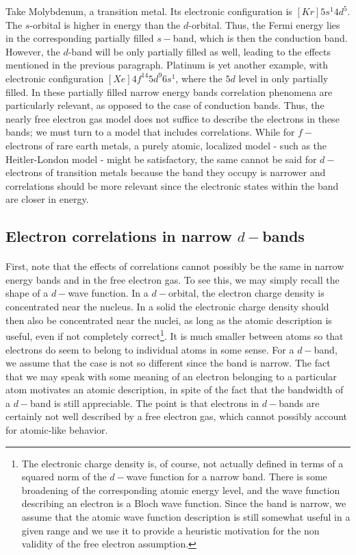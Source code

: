 \documentclass[10pt, twocolumn, twoside]{article}
\begin{document}
Take Molybdenum, a transition metal. Its electronic configuration is $[Kr] 5s^1 4d^5$. The $s$-orbital is higher in energy than the $d$-orbital. Thus, the Fermi energy lies in the corresponding partially filled $s-$band, which is then the conduction band. However, the $d$-band will be only partially filled as well, leading to the effects mentioned in the previous paragraph. Platinum is yet another example, with electronic configuration $[Xe]4f^{14} 5d^9 6s^1 $, where the $5d$ level in only partially filled. In these partially filled narrow energy bands correlation phenomena are particularly relevant, as opposed to the case of conduction bands. Thus, the nearly free electron gas model does not suffice to describe the electrons in these bands; we must turn to a model that includes correlations. While for $f-$electrons of rare earth metals, a purely atomic, localized model - such as the Heitler-London model - might be satisfactory, the same cannot be said for $d-$electrons of transition metals because the band they occupy is narrower and correlations should be more relevant since the electronic states within the band are closer in energy.

\subsection{Electron correlations in narrow $d-$bands}\paragraph{}

First, note that the effects of correlations cannot possibly be the same in narrow energy bands and in the free electron gas. To see this, we may simply recall the shape of a $d-$wave function. In a $d-$orbital, the electron charge density is concentrated near the nucleus. In a solid the electronic charge density should then also be concentrated near the nuclei, as long as the atomic description is useful, even if not completely correct\footnote{The electronic charge density is, of course, not actually defined in terms of a squared norm of the $d-$wave function for a narrow band. There is some broadening of the corresponding atomic energy level, and the wave function describing an electron is a Bloch wave function. Since the band is narrow, we assume that the atomic wave function description is still somewhat useful in a given range and we use it to provide a heuristic motivation for the non validity of the free electron assumption.}. It is much smaller between atoms so that electrons do seem to belong to individual atoms in some sense. For a $d-$band, we assume that the case is not so different since the band is narrow. The fact that we may speak with some meaning of an electron belonging to a particular atom motivates an atomic description, in spite of the fact that the bandwidth of a $d-$band is still appreciable. The point is that electrons in $d-$bands are certainly not well described by a free electron gas, which cannot possibly account for atomic-like behavior.
\end{document}
